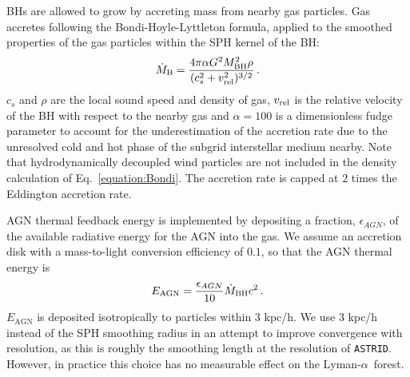 \documentclass[a4paper,11pt]{article}
\newcommand{\Lya}{Lyman-$\alpha$}
\newcommand{\astrid}{\texttt{ASTRID}}
\begin{document}
BHs are allowed to grow by accreting mass from nearby gas particles. Gas accretes following the Bondi-Hoyle-Lyttleton formula, applied to the smoothed properties of the gas particles within the SPH kernel of the BH:
\begin{equation}
\label{equation:Bondi}
    \dot{M}_{\rm B} = \frac{4 \pi \alpha G^2 M_{\rm BH}^2 \rho}{(c^2_s+v_{\rm rel}^2)^{3/2}}\,.
\end{equation}
$c_s$ and $\rho$ are the local sound speed and density of gas, $v_{\rm rel}$ is the relative velocity of the BH with respect to the nearby gas and $\alpha = 100$ is a dimensionless fudge parameter to account for the underestimation of the accretion rate due to the unresolved cold and hot phase of the subgrid interstellar medium nearby.
Note that hydrodynamically decoupled wind particles are not included in the density calculation of Eq.~\ref{equation:Bondi}. The accretion rate is capped at $2$ times the Eddington accretion rate.

AGN thermal feedback energy is implemented by depositing a fraction, $\epsilon_{AGN}$, of the available radiative energy for the AGN into the gas. We assume an accretion disk with a mass-to-light conversion efficiency of $0.1$, so that the AGN thermal energy is \cite{Shakura:1973}
\begin{equation}
\label{equation:Lbol}
    E_\mathrm{AGN} = \frac{\epsilon_{AGN}}{10} \dot{M}_{\rm BH} c^2\,.
\end{equation}
$E_\mathrm{AGN}$ is deposited isotropically to particles within $3$ kpc/h. We use $3$ kpc/h instead of the SPH smoothing radius in an attempt to improve convergence with resolution, as this is roughly the smoothing length at the resolution of \astrid. However, in practice this choice has no measurable effect on the \Lya~forest. %
\end{document}

